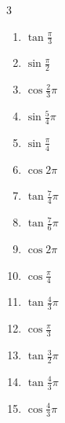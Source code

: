 \begin{multicols}{3}
\begin{enumerate}
  \item $\displaystyle \tan{\frac{\pi}{3}}$

  \item $\displaystyle \sin{\frac{\pi}{2}}$
        \phantom{$\displaystyle =1$}

  \item $\displaystyle \cos{\frac{2}{3}\pi}$

  \item $\displaystyle \sin{\frac{5}{4}\pi}$

\columnbreak %

  \item $\displaystyle \sin{\frac{\pi}{4}}$

  \item $\displaystyle \cos{2\pi}$
        \phantom{$\displaystyle =1$}

  \item $\displaystyle \tan{\frac{7}{4}\pi}$
        \phantom{$\displaystyle =-1$}

  \item $\displaystyle \tan{\frac{7}{6}\pi}$

  \item $\displaystyle \cos{2\pi}$
        \phantom{$\displaystyle =1$}

  \item $\displaystyle \cos{\frac{\pi}{4}}$

  \item $\displaystyle \tan{\frac{4}{3}\pi}$

  \item $\displaystyle \cos{\frac{\pi}{3}}$

  \item $\displaystyle \tan{\frac{3}{2}\pi}$
        \phantom{$\displaystyle \quad なし$}

  \item $\displaystyle \tan{\frac{4}{3}\pi}$

  \item $\displaystyle \cos{\frac{4}{3}\pi}$


\end{enumerate}
\end{multicols}
